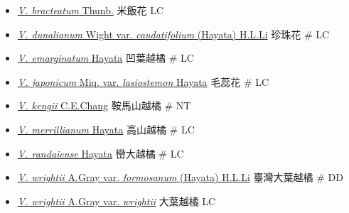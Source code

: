\begin{itemize}
  \begin{itemize}
        \item[] \href{http://www.theplantlist.org/tpl1.1/search?q=Vaccinium+bracteatum}{\textit{V. bracteatum} Thunb.}   米飯花   LC
        \item[] \href{http://www.theplantlist.org/tpl1.1/search?q=Vaccinium+dunalianum+var.+caudatifolium}{\textit{V. dunalianum} Wight var. \textit{caudatifolium} (Hayata) H.L.Li}   珍珠花  \# LC
        \item[] \href{http://www.theplantlist.org/tpl1.1/search?q=Vaccinium+emarginatum}{\textit{V. emarginatum} Hayata}   凹葉越橘  \# LC
        \item[] \href{http://www.theplantlist.org/tpl1.1/search?q=Vaccinium+japonicum+var.+lasiostemon}{\textit{V. japonicum} Miq. var. \textit{lasiostemon} Hayata}   毛蕊花  \# LC
        \item[] \href{http://www.theplantlist.org/tpl1.1/search?q=Vaccinium+kengii}{\textit{V. kengii} C.E.Chang}   鞍馬山越橘  \# NT
        \item[] \href{http://www.theplantlist.org/tpl1.1/search?q=Vaccinium+merrillianum}{\textit{V. merrillianum} Hayata}   高山越橘  \# LC
        \item[] \href{http://www.theplantlist.org/tpl1.1/search?q=Vaccinium+randaiense}{\textit{V. randaiense} Hayata}   巒大越橘  \# LC
        \item[] \href{http://www.theplantlist.org/tpl1.1/search?q=Vaccinium+wrightii+var.+formosanum}{\textit{V. wrightii} A.Gray var. \textit{formosanum} (Hayata) H.L.Li}   臺灣大葉越橘  \# DD
        \item[] \href{http://www.theplantlist.org/tpl1.1/search?q=Vaccinium+wrightii+var.+wrightii}{\textit{V. wrightii} A.Gray var. \textit{wrightii}}   大葉越橘   LC
  \end{itemize}
  \end{itemize}
